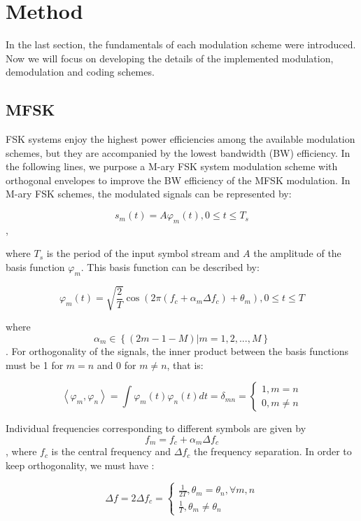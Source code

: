 \documentclass[12pt,a4paper,openright]{article}
\begin{document}
\section{Method}

In the last section, the fundamentals of each modulation scheme were introduced. Now we will focus on developing the details of the implemented modulation, demodulation and coding schemes. 

\subsection{MFSK}

FSK systems enjoy the highest power efficiencies among the available modulation schemes, but they are accompanied by the lowest bandwidth (BW) efficiency. In the following lines, we purpose a M-ary FSK system modulation scheme with orthogonal envelopes to improve the BW efficiency of the MFSK modulation. In M-ary FSK schemes, the modulated signals can be represented by:

\[{s_m}(t) = A{\varphi _m}(t),0 \le t \le T_s\],

where $T_s$ is the period of the input symbol stream and $A$ the amplitude of the basis function $\varphi_m$. This basis function can be described by:

\[{\varphi _m}(t) = \sqrt {\frac{2}{T}} \cos \left( {2\pi ({f_c} + {\alpha _m}\Delta {f_c}) + {\theta _m}} \right),0 \le t \le T\]


where \[{\alpha _m} \in \left\{ {(2m - 1 - M)|m = 1,2,...,M} \right\}\]. For orthogonality of the signals, the inner product between the basis functions must be 1 for $m=n$ and 0 for $m\neq n$, that is: 

\[\left\langle {\left. {{\varphi _m},{\varphi _n}} \right\rangle } \right. = \int {{\varphi _m}(t){\varphi _n}(t)dt = {\delta _{mn}} = \left\{ \begin{array}{l}
1,m = n\\
0,m \ne n
\end{array} \right.} \]


Individual frequencies corresponding to different symbols are given by \[{f_m} = {f_c} + {\alpha _m}\Delta {f_c}\], where $f_c$ is the central frequency and $\Delta f_c$ the frequency separation. In order to keep orthogonality, we must have \cite{gold}:

\[\Delta {f}= 2\Delta {f_c} = \left\{ \begin{array}{l}
\frac{1}{{2T}},{\theta _m} = {\theta _n},\forall m,n\\
\frac{1}{T},{\theta _m} \ne {\theta _n}
\end{array} \right.\]
\end{document}
